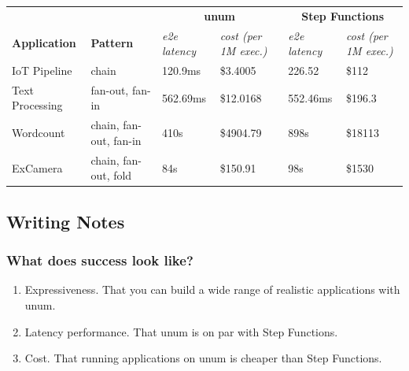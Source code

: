 \begin{table}[t]
\begin{tabular}{llllll}
\hline
                     &                        & \multicolumn{2}{c}{\textbf{unum}}                                                                                                   & \multicolumn{2}{c}{\textbf{Step Functions}}                                                                     \\
\textbf{Application} & \textbf{Pattern}                & \textit{e2e latency} & \textit{cost (per 1M exec.)}                                                                                 & \textit{e2e latency} & \textit{cost (per 1M exec.)}                                                             \\ \hline
IoT Pipeline         & chain                  & 120.9ms              & \$3.4005                                                                            & 226.52               & \$112                                                                          \\
Text Processing      & fan-out, fan-in        & 562.69ms             & \$12.0168                                               & 552.46ms             & \$196.3                                                                           \\
Wordcount            & chain, fan-out, fan-in & 410s                 & \$4904.79   & 898s                 & \$18113 \\
ExCamera             & chain, fan-out, fold   & 84s                  & \$150.91 & 98s                  & \$1530      \\ \hline
\end{tabular}
\end{table}

\subsection{Writing Notes}

\subsubsection{What does success look like?}

\begin{enumerate}

    \item Expressiveness. That you can build a wide range of realistic
     applications with unum.

    \item Latency performance. That unum is on par with Step Functions.

    \item Cost. That running applications on unum is cheaper than Step
     Functions.

\end{enumerate}

